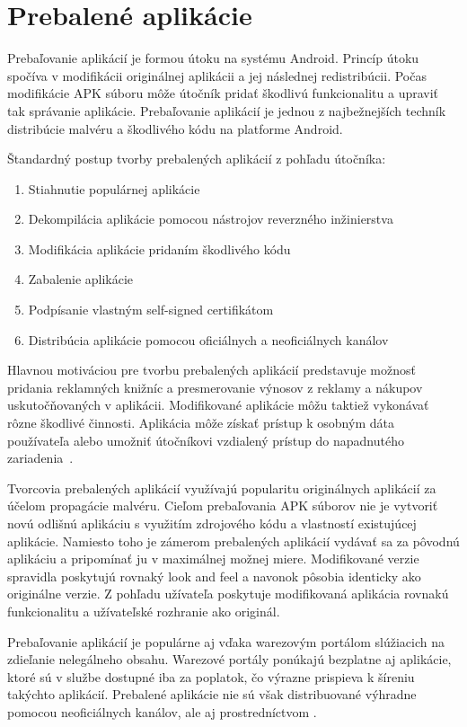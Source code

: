 \chapter{Prebalené aplikácie}
\label{chap:repackaging}
Prebaľovanie aplikácií je formou útoku na systému Android. Princíp útoku spočíva v modifikácii originálnej aplikácii a jej následnej redistribúcii. Počas modifikácie APK súboru môže útočník pridať škodlivú funkcionalitu a upraviť tak správanie aplikácie.
Prebaľovanie aplikácií je jednou z najbežnejších techník distribúcie malvéru a škodlivého kódu na platforme Android. 

Štandardný postup tvorby prebalených aplikácií z pohľadu útočníka:
\begin{enumerate}
	\item Stiahnutie populárnej aplikácie
	\item Dekompilácia aplikácie pomocou nástrojov reverzného inžinierstva
	\item Modifikácia aplikácie pridaním škodlivého kódu
	\item Zabalenie aplikácie
	\item Podpísanie vlastným self-signed certifikátom
	\item Distribúcia aplikácie pomocou oficiálnych a neoficiálnych kanálov 
\end{enumerate}

Hlavnou motiváciou pre tvorbu prebalených aplikácií predstavuje možnosť pridania reklamných knižníc a presmerovanie výnosov z reklamy a nákupov uskutočňovaných v aplikácii. Modifikované aplikácie môžu  taktiež vykonávať rôzne škodlivé činnosti. Aplikácia môže získať prístup k osobným dáta používateľa alebo umožniť útočníkovi vzdialený prístup do napadnutého zariadenia~\cite{DetectingRepackagedZhou, Zhou2012}.

Tvorcovia prebalených aplikácií využívajú popularitu originálnych aplikácií za účelom propagácie malvéru. Cieľom prebaľovania APK súborov nie je vytvoriť novú odlišnú aplikáciu s využitím zdrojového kódu a vlastností existujúcej aplikácie. Namiesto toho je zámerom prebalených aplikácií vydávať sa za pôvodnú aplikáciu a pripomínať ju v maximálnej možnej miere. Modifikované verzie spravidla poskytujú rovnaký look and feel a navonok pôsobia identicky ako originálne verzie. Z pohľadu užívateľa poskytuje modifikovaná aplikácia rovnakú funkcionalitu a užívateľské rozhranie ako originál. 

Prebaľovanie aplikácií je populárne aj vďaka warezovým portálom slúžiacich na zdieľanie nelegálneho obsahu. Warezové portály ponúkajú bezplatne aj aplikácie, ktoré sú v službe  dostupné iba za poplatok, čo výrazne prispieva k šíreniu takýchto aplikácií. Prebalené aplikácie nie sú však distribuované výhradne pomocou neoficiálnych kanálov, ale aj prostredníctvom .

